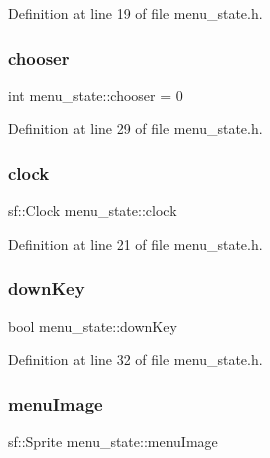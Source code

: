 Definition at line 19 of file menu\+\_\+state.\+h.

\hypertarget{classmenu__state_ad2cb1aba8756c2755fac3b46a4a9bd4e}{}\label{classmenu__state_ad2cb1aba8756c2755fac3b46a4a9bd4e} 
\subsubsection{\texorpdfstring{chooser}{chooser}}
{\footnotesize\ttfamily int menu\+\_\+state\+::chooser = 0\hspace{0.3cm}{\ttfamily [protected]}}



Definition at line 29 of file menu\+\_\+state.\+h.

\hypertarget{classmenu__state_a30e5272db9f1bc92913929d05c735803}{}\label{classmenu__state_a30e5272db9f1bc92913929d05c735803} 
\subsubsection{\texorpdfstring{clock}{clock}}
{\footnotesize\ttfamily sf\+::\+Clock menu\+\_\+state\+::clock}



Definition at line 21 of file menu\+\_\+state.\+h.

\hypertarget{classmenu__state_a37458b8737ec94f051de97d8e3b00c37}{}\label{classmenu__state_a37458b8737ec94f051de97d8e3b00c37} 
\subsubsection{\texorpdfstring{down\+Key}{downKey}}
{\footnotesize\ttfamily bool menu\+\_\+state\+::down\+Key\hspace{0.3cm}{\ttfamily [protected]}}



Definition at line 32 of file menu\+\_\+state.\+h.

\hypertarget{classmenu__state_ae4dd48b435e7941bdfc921a8f2945060}{}\label{classmenu__state_ae4dd48b435e7941bdfc921a8f2945060} 
\subsubsection{\texorpdfstring{menu\+Image}{menuImage}}
{\footnotesize\ttfamily sf\+::\+Sprite menu\+\_\+state\+::menu\+Image}



